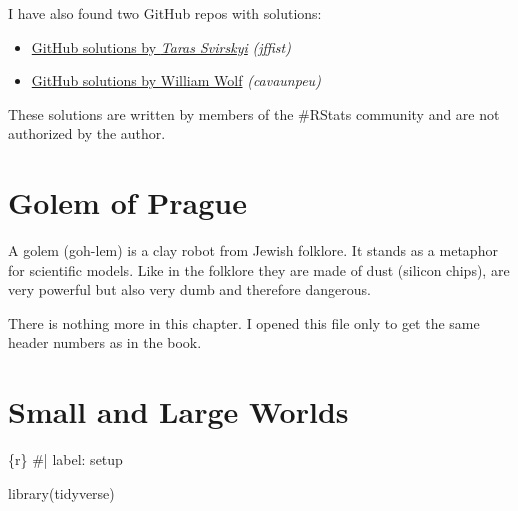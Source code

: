 \documentclass[
  letterpaper,
  DIV=11,
  numbers=noendperiod]{scrreprt}
\newenvironment{Shaded}{\begin{snugshade}}{\end{snugshade}}
\newcommand{\CommentTok}[1]{\textcolor[rgb]{0.37,0.37,0.37}{#1}}
\newcommand{\FunctionTok}[1]{\textcolor[rgb]{0.28,0.35,0.67}{#1}}
\newcommand{\InformationTok}[1]{\textcolor[rgb]{0.37,0.37,0.37}{#1}}
\newcommand{\NormalTok}[1]{\textcolor[rgb]{0.00,0.23,0.31}{#1}}
\providecommand{\tightlist}{%
  \setlength{\itemsep}{0pt}\setlength{\parskip}{0pt}}\usepackage{longtable,booktabs,array}
\begin{document}
I have also found two GitHub repos with solutions:

\begin{itemize}
\tightlist
\item
  \href{https://github.com/jffist/statistical-rethinking-solutions}{GitHub
  solutions by \emph{Taras Svirskyi}} \emph{(jffist)}
\item
  \href{https://github.com/cavaunpeu/statistical-rethinking}{GitHub
  solutions by William Wolf} \emph{(cavaunpeu)}
\end{itemize}

\begin{tcolorbox}[enhanced jigsaw, colframe=quarto-callout-caution-color-frame, colback=white, toprule=.15mm, breakable, arc=.35mm, bottomtitle=1mm, colbacktitle=quarto-callout-caution-color!10!white, toptitle=1mm, titlerule=0mm, title=\textcolor{quarto-callout-caution-color}{\faFire}\hspace{0.5em}{Caution}, leftrule=.75mm, opacityback=0, rightrule=.15mm, opacitybacktitle=0.6, bottomrule=.15mm, left=2mm, coltitle=black]

These solutions are written by members of the \#RStats community and are
not authorized by the author.

\end{tcolorbox}


\hypertarget{golem-of-prague}{%
\chapter{Golem of Prague}\label{golem-of-prague}}

A golem (goh-lem) is a clay robot from Jewish folklore. It stands as a
metaphor for scientific models. Like in the folklore they are made of
dust (silicon chips), are very powerful but also very dumb and therefore
dangerous.

There is nothing more in this chapter. I opened this file only to get
the same header numbers as in the book.


\hypertarget{sec-small-and-large-worlds}{%
\chapter{Small and Large Worlds}\label{sec-small-and-large-worlds}}

\begin{Shaded}
\begin{Highlighting}[]
\InformationTok{\textasciigrave{}\textasciigrave{}\textasciigrave{}\{r\}}
\CommentTok{\#| label: setup}

\FunctionTok{library}\NormalTok{(tidyverse)}
\InformationTok{\textasciigrave{}\textasciigrave{}\textasciigrave{}}
\end{Highlighting}
\end{Shaded}
\end{document}
